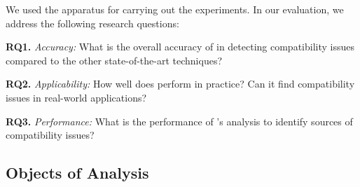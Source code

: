 We used the \@approach apparatus for carrying out the experiments. In our evaluation, we address the following research questions:


\textbf{RQ1.} \textit{Accuracy:} What is the overall accuracy of \@approach in detecting compatibility issues compared to the other state-of-the-art techniques?

\textbf{RQ2.} \textit{Applicability:} How well does \@approach perform in practice? Can it find compatibility issues in real-world applications?

\textbf{RQ3.} \textit{Performance:} What is the performance of \@approach's analysis to identify sources of compatibility issues?

\subsection{Objects of Analysis}


